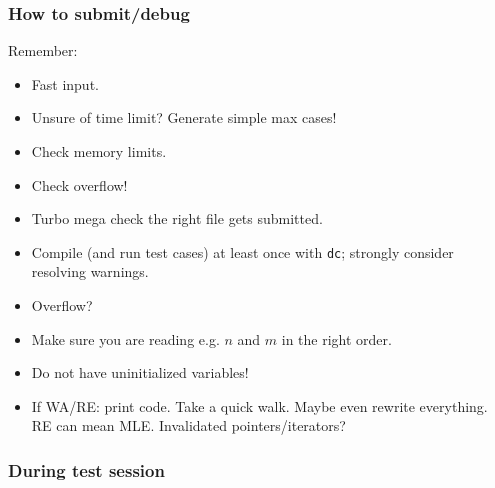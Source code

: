 \subsubsection*{How to submit/debug}

Remember:

\begin{itemize}
	\item Fast input.

	\item Unsure of time limit? Generate simple max cases!

	\item Check memory limits.

	\item Check overflow!

	\item Turbo mega check the right file gets submitted.

	\item Compile (and run test cases) at least once with \texttt{dc}; strongly consider resolving warnings.

	\item Overflow?

	\item Make sure you are reading e.g. $n$ and $m$ in the right order.

	\item Do not have uninitialized variables!

	\item If WA/RE: print code. Take a quick walk. Maybe even rewrite everything. RE can mean MLE. Invalidated pointers/iterators?
\end{itemize}

\subsubsection*{During test session}

